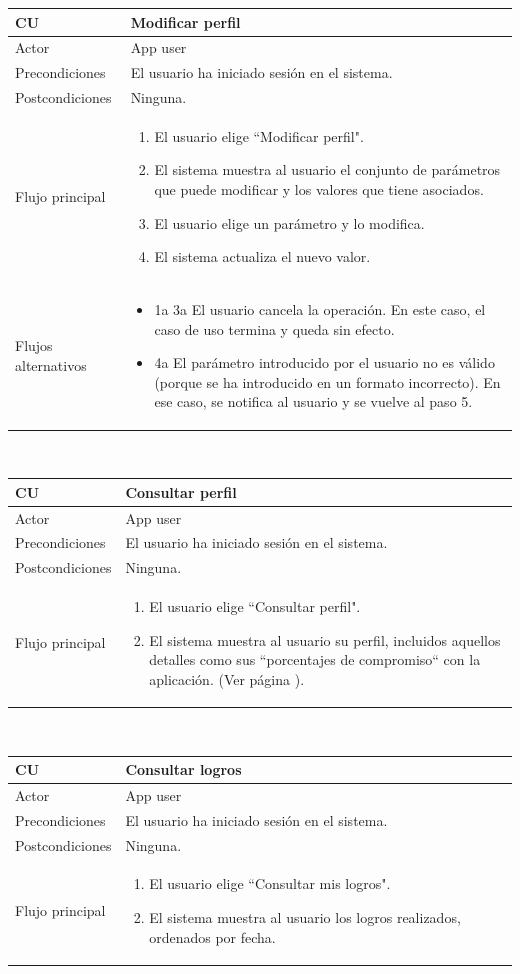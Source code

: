\documentclass[twoside]{report}
\newcommand\addrow[2]{#1 &#2\\ }
\newcommand\addheading[2]{#1 &#2\\ \hline}
\newcommand\tabularhead{\begin{tabular}{lp{0.7\textwidth}}
\hline
}
\newenvironment{usecase}{\tabularhead}
{\hline\end{tabular}}
\begin{document}
\begin{usecase}
  \addheading{\textbf{CU\arabic{usecase}}}{Modificar perfil} 
  \addrow{Actor}{App user}
  \addrow{Precondiciones}{El usuario ha iniciado sesión en el sistema.}
  \addrow{Postcondiciones}{Ninguna.}
  \addrow{Flujo principal}{
  		\begin{enumerate}
  		\item El usuario elige “Modificar perfil". %
  		\item El sistema muestra al usuario el conjunto de parámetros que puede modificar y los valores que tiene asociados. %
  		\item El usuario elige un parámetro y lo modifica. %
  		\item El sistema actualiza el nuevo valor. %
  		\end{enumerate}
  }
  \addrow{Flujos alternativos}{
  		\begin{itemize}
  		\item 1a 3a El usuario cancela la operación. En este caso, el caso de uso termina y queda sin efecto.
  		\item 4a El parámetro introducido por el usuario no es válido (porque se ha introducido en un formato incorrecto). En ese caso, se notifica al usuario y se vuelve al paso 5.
  		\end{itemize}
  		}
\end{usecase}\\

\begin{usecase}
  \addheading{\textbf{CU\arabic{usecase}}}{Consultar perfil} 
  \addrow{Actor}{App user}
  \addrow{Precondiciones}{El usuario ha iniciado sesión en el sistema.}
  \addrow{Postcondiciones}{Ninguna.}
  \addrow{Flujo principal}{
  		\begin{enumerate}
  		\item El usuario elige “Consultar perfil".
  		\item El sistema muestra al usuario su perfil, incluidos aquellos detalles como sus  “porcentajes de compromiso“ con la aplicación. (Ver página \pageref{rfcompromiso}).
  		\end{enumerate}
  }
\end{usecase}\\

\begin{usecase}
  \addheading{\textbf{CU\arabic{usecase}}}{Consultar logros} 
  \addrow{Actor}{App user}
  \addrow{Precondiciones}{El usuario ha iniciado sesión en el sistema.}
  \addrow{Postcondiciones}{Ninguna.}
  \addrow{Flujo principal}{
  		\begin{enumerate}
  		\item El usuario elige “Consultar mis logros".
  		\item El sistema muestra al usuario los logros realizados, ordenados por fecha.
  		\end{enumerate}
  }
\end{usecase}\\
\end{document}
